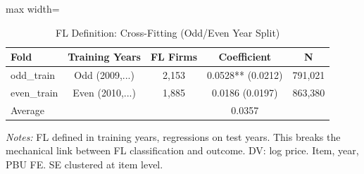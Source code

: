 \begin{table}[htbp]
\centering
\caption{FL Definition: Cross-Fitting (Odd/Even Year Split)}
\label{tab:fl_crossfit}
\begin{adjustbox}{max width=\textwidth}
\begin{threeparttable}
\small
\begin{tabular}{lcccc}
\toprule
Fold & Training Years & FL Firms & Coefficient & N \\
\midrule
odd_train & Odd (2009,...) & 2,153 & 0.0528** (0.0212) & 791,021 \\
even_train & Even (2010,...) & 1,885 & 0.0186 (0.0197) & 863,380 \\
\midrule
Average & & & 0.0357 & \\
\bottomrule
\end{tabular}
\begin{tablenotes}
\small
\item \textit{Notes:} FL defined in training years, regressions on test years.
This breaks the mechanical link between FL classification and outcome.
DV: log price. Item, year, PBU FE. SE clustered at item level.
\end{tablenotes}
\end{threeparttable}
\end{adjustbox}
\end{table}
